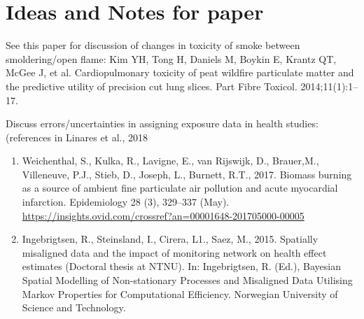 \section{Ideas and Notes for paper}

See this paper for discussion of changes in toxicity of smoke between smoldering/open flame: Kim YH, Tong H, Daniels M, Boykin E, Krantz QT, McGee J, et al.
Cardiopulmonary toxicity of peat wildfire particulate matter and the predictive
utility of precision cut lung slices. Part Fibre Toxicol. 2014;11(1):1–17.

Discuss errors/uncertainties in assigning exposure data in health studies: (references in Linares et al., 2018 \cite{linares_impact_2018}
\begin{enumerate}
\item Weichenthal, S., Kulka, R., Lavigne, E., van Rijswijk, D., Brauer,M., Villeneuve, P.J., Stieb, D.,
Joseph, L., Burnett, R.T., 2017. Biomass burning as a source of ambient fine particulate
air pollution and acute myocardial infarction. Epidemiology 28 (3), 329–337 (May). \url{https://insights.ovid.com/crossref?an=00001648-201705000-00005}

\item Ingebrigtsen, R., Steinsland, I., Cirera, L1., Saez, M., 2015. Spatially misaligned data and the
impact of monitoring network on health effect estimates (Doctoral thesis at NTNU).
In: Ingebrigtsen, R. (Ed.), Bayesian Spatial Modelling of Non-stationary Processes
and Misaligned Data Utilising Markov Properties for Computational Efficiency. Norwegian
University of Science and Technology. 
\end{enumerate}